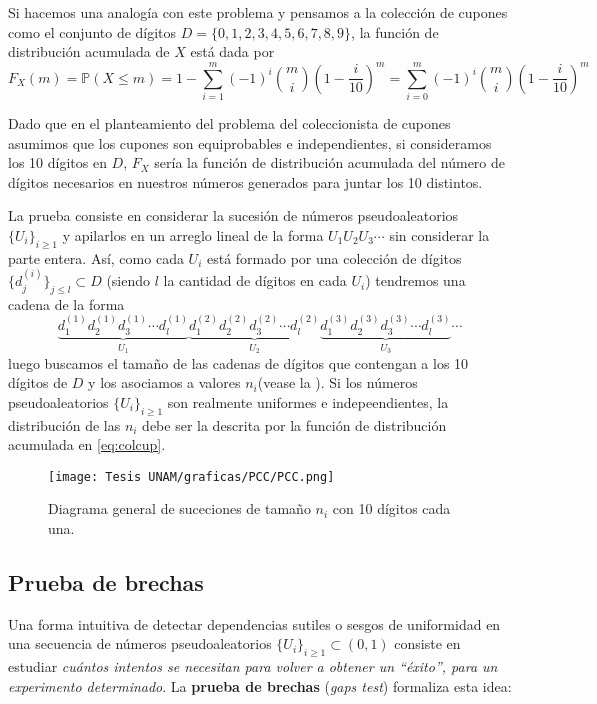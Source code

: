 \documentclass[../Main.tex]{subfiles}
\begin{document}
 
Si hacemos una analogía con este problema y pensamos a la colección de cupones como el conjunto de dígitos \(D=\{0,1,2,3,4,5,6,7,8,9\}\), la función de distribución acumulada de $X$ está dada por 
\begin{equation}
F_X(m)=\mathbb{P}(X\leq m)=1 - \sum_{i=1}^{m} (-1)^{i} \binom{m}{i} \left(1 - \frac{i}{10}\right)^m=\sum_{i=0}^{m}(-1)^i\binom{m}{i}\left(1-\frac{i}{10}\right)^m
\label{eq:colcup}
\end{equation}

Dado que en el planteamiento del problema del coleccionista de cupones asumimos que los cupones son equiprobables e independientes, si consideramos los 10 dígitos en $D$, $F_X$ sería la función de distribución acumulada del número de dígitos necesarios en nuestros números generados para juntar los 10 distintos.  

La prueba consiste en considerar la sucesión de números pseudoaleatorios $\{U_i\}_{i\ge 1}$ y apilarlos en un arreglo lineal de la forma $U_1U_2U_3\cdots$ sin considerar la parte entera. Así, como cada $U_i$ está formado por una colección de dígitos $\{d_j^{(i)}\}_{j\leq l} \subset D$ (siendo $l$ la cantidad de dígitos en cada $U_i$) tendremos una cadena de la forma 
$$
\underbrace{d_1^{(1)}d_2^{(1)}d_3^{(1)}\cdots d_l^{(1)}}_{U_1} 
\underbrace{d_1^{(2)}d_2^{(2)}d_3^{(2)}\cdots d_l^{(2)}}_{U_2}
\underbrace{d_1^{(3)}d_2^{(3)}d_3^{(3)}\cdots d_l^{(3)}}_{U_3}
\cdots
$$
luego buscamos el tamaño de las cadenas de dígitos que contengan a los 10 dígitos de $D$ y los asociamos a valores $n_i$(vease la ). Si los números pseudoaleatorios $\{U_i\}_{i\ge 1}$ son realmente uniformes e indepeendientes, la distribución de las $n_i$ debe ser la descrita por la función de distribución acumulada en \ref{eq:colcup}.
\begin{figure}[h]                   \texttt{[image: Tesis UNAM/graficas/PCC/PCC.png]}
        \centering
        \caption{Diagrama general de suceciones  de tamaño $n_i$ con 10 dígitos cada una.}
        \label{fig:PCC}
    \end{figure}





\subsection*{Prueba de brechas}

Una forma intuitiva de detectar dependencias sutiles o sesgos de
uniformidad en una secuencia de números pseudoaleatorios
$\{U_i\}_{i\ge 1}\subset(0,1)$ consiste en estudiar
\emph{cuántos intentos se necesitan para volver a obtener un “éxito”, para un experimento determinado}.  
La \textbf{prueba de brechas} (\textit{gaps test}) formaliza esta idea:
\end{document}
